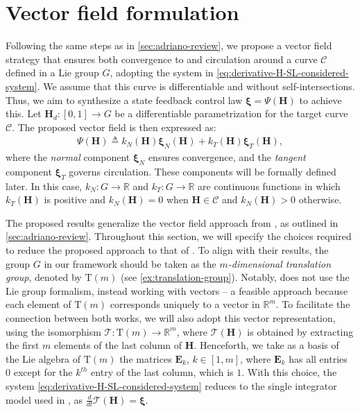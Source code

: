 \section{Vector field formulation}
Following the same steps as in \cref{sec:adriano-review}, we propose a vector field strategy that ensures both convergence to and circulation around a curve $\mathcal{C}$ defined in a Lie group $G$, adopting the system in \eqref{eq:derivative-H-SL-considered-system}. We assume that this curve is differentiable and without self-intersections. Thus, we aim to synthesize a state feedback control law $\boldsymbol{\xi}=\Psi\left(\mathbf{H}\right)$ to achieve this. Let $\mathbf{H}_d:[0,1] \to G$ be a differentiable parametrization for the target curve $\mathcal{C}$. The proposed vector field is then expressed as:
\begin{align}
    \Psi\left(\mathbf{H}\right) \triangleq k_N(\mathbf{H})\boldsymbol{\xi}_N(\mathbf{H}) + k_T(\mathbf{H})\boldsymbol{\xi}_T(\mathbf{H}), \label{eq:vector-field-proposition}
\end{align}
where the \emph{normal} component $\boldsymbol{\xi}_N$ ensures convergence, and the \emph{tangent} component $\boldsymbol{\xi}_T$ governs circulation. These components will be formally defined later. In this case, $k_N: G \to \mathbb{R}$ and $k_T: G \to \mathbb{R}$ are continuous functions in which $k_T(\mathbf{H})$ is positive and $k_N(\mathbf{H})=0$ when $\mathbf{H} \in \mathcal{C}$ and $k_N(\mathbf{H}) > 0$ otherwise. 
\begin{remark}
    The proposed results generalize the vector field approach from \citet{Rezende2022}, as outlined in \cref{sec:adriano-review}. Throughout this section, we will specify the choices required to reduce the proposed approach to that of \citet{Rezende2022}. To align with their results, the group $G$ in our framework should be taken as the \emph{$m$-dimensional translation group}, denoted by $\text{T}(m)$ (see \cref{ex:translation-group}). Notably, \citet{Rezende2022}  does not use the Lie group formalism, instead working with vectors -- a feasible approach because each element of $\text{T}(m)$ corresponds uniquely to a vector in $\mathbb{R}^m$. To facilitate the connection between both works, we will also adopt this vector representation, using the isomorphism $\mathcal{T}: \text{T}(m) \to \mathbb{R}^m$, where $\mathcal{T}(\mathbf{H})$ is obtained by extracting the first $m$ elements of the last column of $\mathbf{H}$. Henceforth, we take as a basis of the Lie algebra of $\text{T}(m)$ the matrices $\mathbf{E}_k$, $k \in [1,m]$, where $\mathbf{E}_k$ has all entries $0$ except for the $k^{th}$ entry of the last column, which is $1$. With this choice, the system \eqref{eq:derivative-H-SL-considered-system} reduces to the single integrator model used in \citet{Rezende2022}, as $\frac{d}{dt} \mathcal{T}(\mathbf{H}) = \boldsymbol{\xi}$.  
\end{remark}

